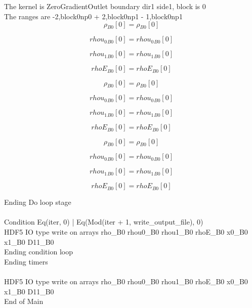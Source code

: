 \documentclass{article}
\begin{document}
\noindent The kernel is ZeroGradientOutlet boundary dir1 side1, block is 0\\\noindent The ranges are -2,block0np0 + 2,block0np1 - 1,block0np1\\\begin{dmath}{\rho{_{B0}}}[{0}] = {\rho{_{B0}}}[{0}]\end{dmath}

\begin{dmath}{rhou_{0}{_{B0}}}[{0}] = {rhou_{0}{_{B0}}}[{0}]\end{dmath}

\begin{dmath}{rhou_{1}{_{B0}}}[{0}] = {rhou_{1}{_{B0}}}[{0}]\end{dmath}

\begin{dmath}{rhoE{_{B0}}}[{0}] = {rhoE{_{B0}}}[{0}]\end{dmath}

\begin{dmath}{\rho{_{B0}}}[{0}] = {\rho{_{B0}}}[{0}]\end{dmath}

\begin{dmath}{rhou_{0}{_{B0}}}[{0}] = {rhou_{0}{_{B0}}}[{0}]\end{dmath}

\begin{dmath}{rhou_{1}{_{B0}}}[{0}] = {rhou_{1}{_{B0}}}[{0}]\end{dmath}

\begin{dmath}{rhoE{_{B0}}}[{0}] = {rhoE{_{B0}}}[{0}]\end{dmath}

\begin{dmath}{\rho{_{B0}}}[{0}] = {\rho{_{B0}}}[{0}]\end{dmath}

\begin{dmath}{rhou_{0}{_{B0}}}[{0}] = {rhou_{0}{_{B0}}}[{0}]\end{dmath}

\begin{dmath}{rhou_{1}{_{B0}}}[{0}] = {rhou_{1}{_{B0}}}[{0}]\end{dmath}

\begin{dmath}{rhoE{_{B0}}}[{0}] = {rhoE{_{B0}}}[{0}]\end{dmath}

\noindent Ending Do loop stage\\
\\\noindent Condition Eq(iter, 0) | Eq(Mod(iter + 1, write_output_file), 0)\\\noindent HDF5 IO type write on arrays rho_B0 rhou0_B0 rhou1_B0 rhoE_B0 x0_B0 x1_B0 D11_B0\\\noindent Ending condition loop %
\\\noindent Ending timers\\
\\\noindent HDF5 IO type write on arrays rho_B0 rhou0_B0 rhou1_B0 rhoE_B0 x0_B0 x1_B0 D11_B0\\\noindent End of Main\\
\end{document}
